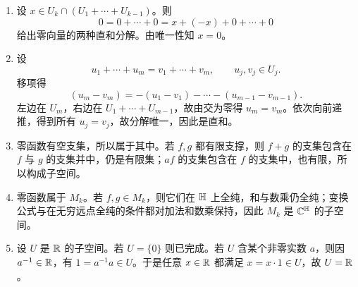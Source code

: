 \begin{enumerate}[label=\textbf{\arabic*.},start=46]
\[ (a,0,0,0)+(0,b,0,0)+(0,0,c,d),
\] 故和为全体 $\R^4$。又 $U_1\cap U_2=\{0\}$，且 $U_3$ 与前两者之和只在后两坐标上可能非零，所以交也只有零向量，故为直和。
\item 设 $x\in U_k\cap (U_1+\cdots+U_{k-1})$。则 \[
0=0+\cdots+0=x+(-x)+0+\cdots+0 \]
给出零向量的两种直和分解。由唯一性知 $x=0$。 \item 设
\[ u_1+\cdots+u_m=v_1+\cdots+v_m,
\qquad u_j,v_j\in U_j. \]
移项得 \[
(u_m-v_m)=-(u_1-v_1)-\cdots-(u_{m-1}-v_{m-1}). \]
左边在 $U_m$，右边在 $U_1+\cdots+U_{m-1}$，故由交为零得 $u_m=v_m$。依次向前递推，得到所有 $u_j=v_j$，故分解唯一，因此是直和。 \item 零函数有空支集，所以属于其中。若 $f,g$ 都有限支撑，则 $f+g$ 的支集包含在 $f$ 与 $g$ 的支集并中，仍是有限集；$af$ 的支集包含在 $f$ 的支集中，也有限，所以构成子空间。
\item 零函数属于 $M_k$。若 $f,g\in M_k$，则它们在 $\mathbb{H}$ 上全纯，和与数乘仍全纯；变换公式与在无穷远点全纯的条件都对加法和数乘保持，因此 $M_k$ 是 $\mathbb{C}^{\mathbb{H}}$ 的子空间。 \item 设 $U$ 是 $\mathbb{R}$ 的子空间。若 $U=\{0\}$ 则已完成。若 $U$ 含某个非零实数 $a$，则因 $a^{-1}\in\mathbb{R}$，有 $1=a^{-1}a\in U$。于是任意 $x\in\mathbb{R}$ 都满足 $x=x\cdot 1\in U$，故 $U=\mathbb{R}$。
\end{enumerate}
